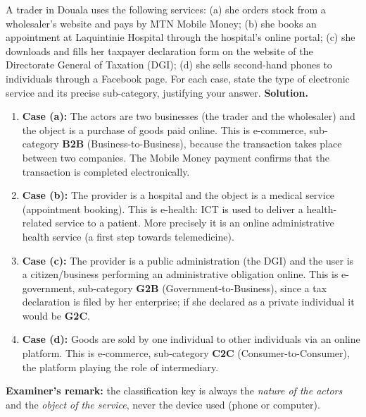 \documentclass[11pt]{article}
\newcommand{\cle}[1]{{\popxbold\color{popdark}#1}}
\newcounter{popsec}
\newcounter{popsub}
\newcommand{\courssub}[1]{%
  \stepcounter{popsub}%
  \par\vspace{9pt}\noindent{\popxbold\fontsize{11.5}{13}\selectfont\color{popink}{\color{poporange}\thepopsec.\thepopsub}\hspace{6pt}#1}\par\nopagebreak\vspace{4pt}
}
\begin{document}
\begin{exoresolu}
A trader in Douala uses the following services: (a) she orders stock from a wholesaler's website and pays by MTN Mobile Money; (b) she books an appointment at Laquintinie Hospital through the hospital's online portal; (c) she downloads and fills her taxpayer declaration form on the website of the Directorate General of Taxation (DGI); (d) she sells second-hand phones to individuals through a Facebook page. For each case, state the type of electronic service and its precise sub-category, justifying your answer.
\tcblower
\textbf{Solution.}
\begin{enumerate}
\item \textbf{Case (a):} The actors are two businesses (the trader and the wholesaler) and the object is a purchase of goods paid online. This is \cle{e-commerce}, sub-category \textbf{B2B} (Business-to-Business), because the transaction takes place between two companies. The Mobile Money payment confirms that the transaction is completed electronically.
\item \textbf{Case (b):} The provider is a hospital and the object is a medical service (appointment booking). This is \cle{e-health}: ICT is used to deliver a health-related service to a patient. More precisely it is an online administrative health service (a first step towards telemedicine).
\item \textbf{Case (c):} The provider is a public administration (the DGI) and the user is a citizen/business performing an administrative obligation online. This is \cle{e-government}, sub-category \textbf{G2B} (Government-to-Business), since a tax declaration is filed by her enterprise; if she declared as a private individual it would be \textbf{G2C}.
\item \textbf{Case (d):} Goods are sold by one individual to other individuals via an online platform. This is \cle{e-commerce}, sub-category \textbf{C2C} (Consumer-to-Consumer), the platform playing the role of intermediary.
\end{enumerate}
\textbf{Examiner's remark:} the classification key is always the \emph{nature of the actors} and the \emph{object of the service}, never the device used (phone or computer).
\end{exoresolu}

\courssub{Secure E-Commerce Transaction Flow}
\end{document}
